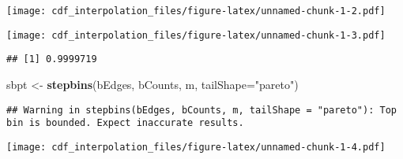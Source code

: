 \documentclass[]{article}
\newenvironment{Shaded}{\begin{snugshade}}{\end{snugshade}}
\newcommand{\DataTypeTok}[1]{\textcolor[rgb]{0.13,0.29,0.53}{#1}}
\newcommand{\DecValTok}[1]{\textcolor[rgb]{0.00,0.00,0.81}{#1}}
\newcommand{\KeywordTok}[1]{\textcolor[rgb]{0.13,0.29,0.53}{\textbf{#1}}}
\newcommand{\NormalTok}[1]{#1}
\newcommand{\OperatorTok}[1]{\textcolor[rgb]{0.81,0.36,0.00}{\textbf{#1}}}
\newcommand{\OtherTok}[1]{\textcolor[rgb]{0.56,0.35,0.01}{#1}}
\newcommand{\StringTok}[1]{\textcolor[rgb]{0.31,0.60,0.02}{#1}}
\begin{document}
\texttt{[image: cdf\_interpolation\_files/figure-latex/unnamed-chunk-1-2.pdf]}

\begin{Shaded}
\end{Shaded}

\texttt{[image: cdf\_interpolation\_files/figure-latex/unnamed-chunk-1-3.pdf]}

\begin{Shaded}
\end{Shaded}

\begin{verbatim}
## [1] 0.9999719
\end{verbatim}

\begin{Shaded}
\begin{Highlighting}[]
\NormalTok{sbpt <-}\StringTok{ }\KeywordTok{stepbins}\NormalTok{(bEdges, bCounts, m, }\DataTypeTok{tailShape=}\StringTok{"pareto"}\NormalTok{)}
\end{Highlighting}
\end{Shaded}

\begin{verbatim}
## Warning in stepbins(bEdges, bCounts, m, tailShape = "pareto"): Top bin is bounded. Expect inaccurate results.
\end{verbatim}

\begin{Shaded}
\end{Shaded}

\texttt{[image: cdf\_interpolation\_files/figure-latex/unnamed-chunk-1-4.pdf]}

\begin{Shaded}
\end{Shaded}
\end{document}
